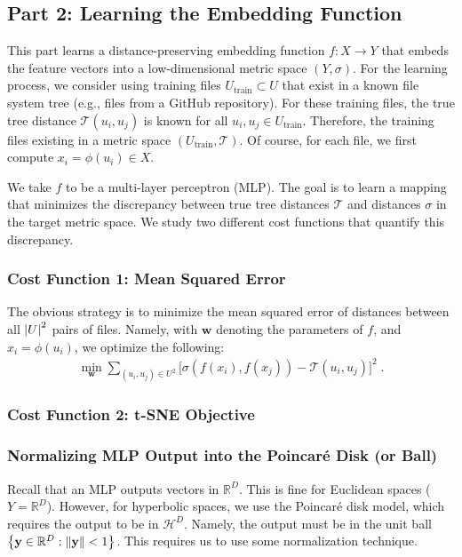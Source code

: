 \documentclass{article}
\begin{document}
\subsection{Part 2: Learning the Embedding Function}

This part learns a distance-preserving embedding function $f: X \to Y$ that embeds the feature vectors into a low-dimensional metric space $(Y, \sigma)$. For the learning process, we consider using training files $U_\text{train} \subset U$ that exist in a known file system tree (e.g., files from a GitHub repository). For these training files, the true tree distance $\mathcal T(u_i, u_j)$ is known for all $u_i, u_j \in U_\text{train}$. Therefore, the training files existing in a metric space $(U_\text{train}, \mathcal T)$. Of course, for each file, we first compute $x_i = \phi(u_i) \in X$.

We take $f$ to be a multi-layer perceptron (MLP). The goal is to learn a mapping that minimizes the discrepancy between true tree distances $\mathcal T$ and distances $\sigma$ in the target metric space. We study two different cost functions that quantify this discrepancy.

\subsubsection{Cost Function 1: Mean Squared Error}

The obvious strategy is to minimize the mean squared error of distances between all $\abs{U}^2$ pairs of files. Namely, with $\mathbf w$ denoting the parameters of $f$, and $x_i = \phi(u_i)$, we optimize the following:
\begin{align*}
  \min_{\mathbf w} \sum_{(u_i, u_j) \in U^2} \Big[ \sigma(f(x_i), f(x_j)) - \mathcal T(u_i, u_j) \Big]^2 \; .
\end{align*}

\subsubsection{Cost Function 2: t-SNE Objective}


\subsubsection{Normalizing MLP Output into the Poincaré Disk (or Ball)}

Recall that an MLP outputs vectors in $\mathbb R^D$. This is fine for Euclidean spaces ($Y = \mathbb R^D$). However, for hyperbolic spaces, we use the Poincaré disk model, which requires the output to be in $\mathcal H^D$. Namely, the output must be in the unit ball $\qty{\mathbf y \in \mathbb R^D : \norm{\mathbf y} < 1}$. This requires us to use some normalization technique.
\end{document}
